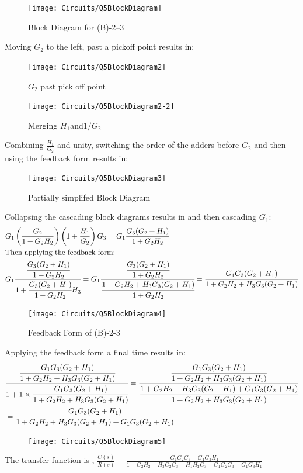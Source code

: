 \documentclass[12pt]{article}
\newenvironment{problem}[2][Problem]{\begin{trivlist}
		\item[\hskip \labelsep {\bfseries #1}\hskip \labelsep {\bfseries #2.}]}{\end{trivlist}}
\begin{document}
\begin{problem}{5 --- (B)-2-3 --- obtain transfer function} \hfill\newline
	
\begin{figure}[H]
	\centering
	\texttt{[image: Circuits/Q5BlockDiagram]}
	\caption{Block Diagram for (B)-2--3}
	\label{fig:q5blockdiagram}
\end{figure}
Moving $G_2$ to the left, past a pickoff point results in:
\begin{figure}[H]
	\centering
	\begin{minipage}{.5\textwidth}
		\centering
		\texttt{[image: Circuits/Q5BlockDiagram2]}
		\caption{$G_2$ past pick off point}
		\label{fig:prob1_6_2}
	\end{minipage}%
	\begin{minipage}{0.5\textwidth}
		\centering
		\texttt{[image: Circuits/Q5BlockDiagram2-2]}
		\caption{Merging $ H_1 \text{and} 1 / G_2$}
		\label{fig:prob1_6_1}
	\end{minipage}
\end{figure}
Combining $\frac{H_1}{G_2}$ and unity, switching the order of the adders before $G_2$ and then using the feedback form results in:
\begin{figure}[H]
	\centering
	\texttt{[image: Circuits/Q5BlockDiagram3]}
	\caption{Partially simplifed Block Diagram}
	\label{fig:q5blockdiagram3}
\end{figure}
Collapsing the cascading block diagrams results in and then cascading $G_1$:
\begin{align*}
& G_1\left(\frac{G_2}{1+G_2H_2}\right)\left(1+\frac{H_1}{G_2}\right)G_3=G_1\frac{G_3(G_2+H_1)}{1+G_2H_2} \\
& \text{Then applying the feedback form:} \\ 
& G_1\cfrac{\cfrac{G_3(G_2+H_1)}{1+G_2H_2}}{1+\cfrac{G_3(G_2+H_1)}{1+G_2H_2}H_3}= G_1\cfrac{\cfrac{G_3(G_2+H_1)}{1+G_2H_2}}{\cfrac{1+G_2H_2+H_3G_3(G_2+H_1)}{1+G_2H_2}}= \cfrac{G_1G_3(G_2+H_1)}{1+G_2H_2+H_3G_3(G_2+H_1)}
\end{align*}
\begin{figure}[H]
	\centering
	\texttt{[image: Circuits/Q5BlockDiagram4]}
	\caption{Feedback Form of (B)-2-3}
	\label{fig:q5blockdiagram4}
\end{figure}
Applying the feedback form a final time results in:
\begin{align*}
& \cfrac{\cfrac{G_1G_3(G_2+H_1)}{1+G_2H_2+H_3G_3(G_2+H_1)}}{1+1\times\cfrac{G_1G_3(G_2+H_1)}{1+G_2H_2+H_3G_3(G_2+H_1)}}= \cfrac{\cfrac{G_1G_3(G_2+H_1)}{1+G_2H_2+H_3G_3(G_2+H_1)}}{\cfrac{1+G_2H_2+H_3G_3(G_2+H_1)+G_1G_3(G_2+H_1)}{1+G_2H_2+H_3G_3(G_2+H_1)}} \\
&= \cfrac{G_1G_3(G_2+H_1)}{1+G_2H_2+H_3G_3(G_2+H_1)+G_1G_3(G_2+H_1)}
\end{align*}
\begin{figure}[H]
	\centering
	\texttt{[image: Circuits/Q5BlockDiagram5]}
\end{figure}
The transfer function is , $\displaystyle \boxed{\frac{C(s)}{R(s)}= \frac{G_1G_2G_3+G_1G_3H_1}{1+G_2H_2+H_3G_2G_3+H_1H_2G_3+G_1G_2G_3+G_1G_3H_1}}$ 
 \nopagebreak
\end{problem}
\end{document}
